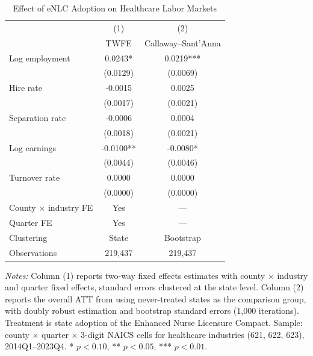 
\begin{table}[H]
\centering
\caption{Effect of eNLC Adoption on Healthcare Labor Markets}
\label{tab:main}
\begin{threeparttable}
\begin{tabular}{lcc}
\toprule
& (1) & (2) \\
& TWFE & Callaway--Sant'Anna \\
\midrule
Log employment & 0.0243* & 0.0219*** \\
 & (0.0129) & (0.0069) \\
[0.5em]
Hire rate & -0.0015 & 0.0025 \\
 & (0.0017) & (0.0021) \\
[0.5em]
Separation rate & -0.0006 & 0.0004 \\
 & (0.0018) & (0.0021) \\
[0.5em]
Log earnings & -0.0100** & -0.0080* \\
 & (0.0044) & (0.0046) \\
[0.5em]
Turnover rate & 0.0000 & 0.0000 \\
 & (0.0000) & (0.0000) \\

\midrule
County $\times$ industry FE & Yes & --- \\
Quarter FE & Yes & --- \\
Clustering & State & Bootstrap \\
Observations & 219,437 & 219,437 \\
\bottomrule
\end{tabular}
\begin{tablenotes}[flushleft]
\small
\item \textit{Notes:} Column (1) reports two-way fixed effects estimates with county $\times$ industry and quarter fixed effects, standard errors clustered at the state level. Column (2) reports the overall ATT from \citet{callaway2021difference} using never-treated states as the comparison group, with doubly robust estimation and bootstrap standard errors (1,000 iterations). Treatment is state adoption of the Enhanced Nurse Licensure Compact. Sample: county $\times$ quarter $\times$ 3-digit NAICS cells for healthcare industries (621, 622, 623), 2014Q1--2023Q4. * $p<0.10$, ** $p<0.05$, *** $p<0.01$.
\end{tablenotes}
\end{threeparttable}
\end{table}


